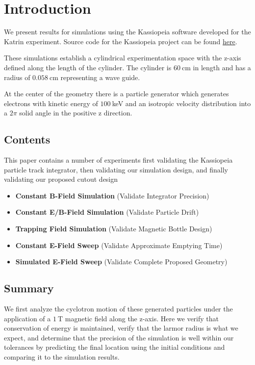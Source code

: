 \documentclass[12pt,letterpaper]{article}
\begin{document}
\section{Introduction}

We present results for simulations using the Kassiopeia software developed for the Katrin experiment. Source code for the Kassiopeia project can be found \href{https://github.com/KATRIN-Experiment/Kassiopeia}{here}. 

These simulations establish a cylindrical experimentation space with the z-axis defined along the length of the cylinder. The cylinder is $60~$cm in length and has a radius of $0.058~$cm representing a wave guide.

At the center of the geometry there is a particle generator which generates electrons with kinetic energy of $100~$keV and an isotropic velocity distribution into a $2\pi$ solid angle in the positive z direction.

\subsection*{Contents}

This paper contains a number of experiments first validating the Kassiopeia particle track integrator, then validating our simulation design, and finally validating our proposed cutout design

\begin{itemize}
    \item \textbf{Constant B-Field Simulation} (Validate Integrator Precision)
    \item \textbf{Constant E/B-Field Simulation} (Validate Particle Drift)
    \item \textbf{Trapping Field Simulation} (Validate Magnetic Bottle Design)
    \item \textbf{Constant E-Field Sweep} (Validate Approximate Emptying Time)
    \item \textbf{Simulated E-Field Sweep} (Validate Complete Proposed Geometry)
\end{itemize}

\subsection*{Summary}

We first analyze the cyclotron motion of these generated particles under the application of a $1~$T magnetic field along the z-axis. Here we verify that conservation of energy is maintained, verify that the larmor radius is what we expect, and determine that the precision of the simulation is well within our tolerances by predicting the final location using the initial conditions and comparing it to the simulation results. 
\end{document}
